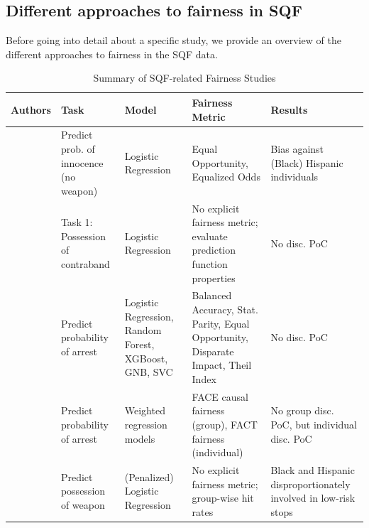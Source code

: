 


\begin{landscape} %
    \subsection{Different approaches to fairness in SQF}

    Before going into detail about a specific study, we provide an overview of the different approaches to fairness in the SQF data.

    \begin{table}[h]
        \centering
        \renewcommand{\arraystretch}{1.2}
        \begin{tabular}{|p{3.5cm}|p{4.5cm}|p{3.5cm}|p{4cm}|p{4.5cm}|}
            \hline
            \textbf{Authors} & \textbf{Task} & \textbf{Model} & \textbf{Fairness Metric} & \textbf{Results} \\
            \hline
            \cite{kallus2018} 
            & Predict prob. of innocence (no weapon) 
            & Logistic Regression 
            & Equal Opportunity, Equalized Odds 
            & Bias against (Black) Hispanic individuals \\ 
            \hline
            \cite{RambachanBBOEFW} 
            & Task 1: Possession of contraband
            & Logistic Regression 
            & No explicit fairness metric; evaluate prediction function properties 
            & No disc. PoC\\
            \hline
            \cite{Badr2022DTFANSP} 
            & Predict probability of arrest 
            & Logistic Regression, Random Forest, XGBoost, GNB, SVC 
            & Balanced Accuracy, Stat. Parity, Equal Opportunity, Disparate Impact, Theil Index 
            & No disc. PoC \\ 
            \hline
            \cite{Khademi2019FADMELC} 
            & Predict probability of arrest 
            & Weighted regression models
            & FACE causal fairness (group), FACT fairness (individual) 
            & No group disc. PoC, but individual disc. PoC \\ 
            \hline
            \cite{goel2016} 
            & Predict possession of weapon 
            & (Penalized) Logistic Regression 
            & No explicit fairness metric; group-wise hit rates 
            & Black and Hispanic disproportionately involved in low-risk stops \\ 
            \hline
        \end{tabular}
        \caption{Summary of SQF-related Fairness Studies}
        \label{tab:sqf_summary}
  \end{table}
\end{landscape} %



